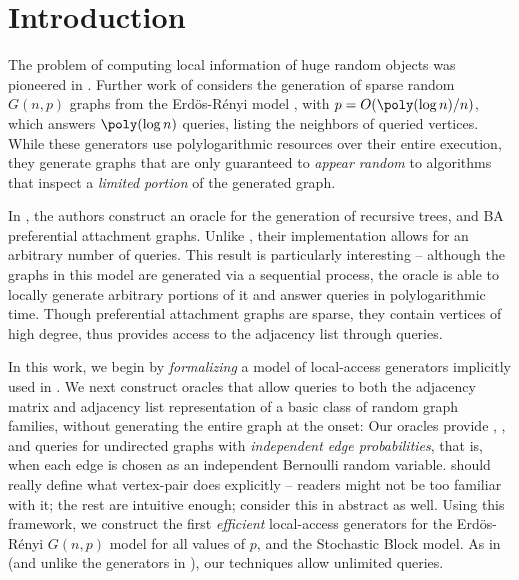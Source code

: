 \section{Introduction}

The problem of computing local information of huge random objects
was pioneered in \cite{huge_old,huge}. 
Further work of \cite{sparse} considers the generation of sparse random $G(n,p)$ graphs
from the Erd\"{o}s-R\'{e}nyi model \cite{er}, with $p = O(\poly(\log n)/n)$,
which answers $\poly(\log n)$  queries,
listing the neighbors of queried vertices.
While these generators use polylogarithmic resources over their entire execution, 
they generate graphs that are  only guaranteed to {\em appear random} to algorithms
that inspect a {\em limited portion} of the generated graph.

In \cite{reut}, the authors construct an oracle for the generation of recursive trees,
and BA preferential attachment graphs.
Unlike \cite{sparse}, their implementation allows for an arbitrary number of queries.
This result is particularly interesting --  
although the graphs in this model are generated via a sequential process,
the oracle is able to locally generate arbitrary portions of it
and answer queries in polylogarithmic time.
Though preferential attachment graphs are sparse,
they contain vertices of high degree,
thus \cite{reut} provides access to 
the adjacency list through  queries.

In this work, we begin by \emph{formalizing} a model of local-access generators
implicitly used in \cite{reut}.
We next construct oracles that allow queries to both the adjacency matrix
and adjacency list representation of a basic class of random
graph families, without generating the entire graph at the onset:
Our oracles
provide , , and  queries
for undirected graphs with {\em independent edge probabilities}, that is,
when each edge is chosen as an independent Bernoulli random variable. {\color{red} should really define what vertex-pair does explicitly -- readers might not be too familiar with it; the rest are intuitive enough; consider this in abstract as well.}
Using this framework, we construct the first \emph{efficient} local-access generators
for the Erd\"{o}s-R\'{e}nyi $G(n,p)$ model for all values of $p$, and the Stochastic Block model.
As in \cite{reut} (and unlike the generators in \cite{huge_old,huge,sparse}), 
our techniques allow unlimited queries.%

